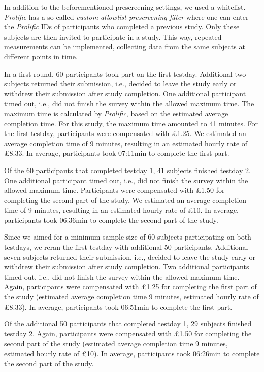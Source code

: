 \documentclass[
  man,floatsintext]{apa6}
\begin{document}
In addition to the beforementioned prescreening settings, we used a whitelist. \emph{Prolific} has a so-called \emph{custom allowlist prescreening filter} where one can enter the \emph{Prolific} IDs of participants who completed a previous study. Only these subjects are then invited to participate in a study. This way, repeated measurements can be implemented, collecting data from the same subjects at different points in time.

In a first round, 60 participants took part on the first testday. Additional two subjects returned their submission, i.e., decided to leave the study early or withdrew their submission after study completion. One additional participant timed out, i.e., did not finish the survey within the allowed maximum time. The maximum time is calculated by \emph{Prolific}, based on the estimated average completion time. For this study, the maximum time amounted to 41 minutes. For the first testday, participants were compensated with £1.25. We estimated an average completion time of 9 minutes, resulting in an estimated hourly rate of £8.33. In average, participants took 07:11min to complete the first part.

Of the 60 participants that completed testday 1, 41 subjects finished testday 2. One additional participant timed out, i.e., did not finish the survey within the allowed maximum time. Participants were compensated with £1.50 for completing the second part of the study. We estimated an average completion time of 9 minutes, resulting in an estimated hourly rate of £10. In average, participants took 06:36min to complete the second part of the study.

Since we aimed for a minimum sample size of 60 subjects participating on both testdays, we reran the first testday with additional 50 participants. Additional seven subjects returned their submission, i.e., decided to leave the study early or withdrew their submission after study completion. Two additional participants timed out, i.e., did not finish the survey within the allowed maximum time. Again, participants were compensated with £1.25 for completing the first part of the study (estimated average completion time 9 minutes, estimated hourly rate of £8.33). In average, participants took 06:51min to complete the first part.

Of the additional 50 participants that completed testday 1, 29 subjects finished testday 2. Again, participants were compensated with £1.50 for completing the second part of the study (estimated average completion time 9 minutes, estimated hourly rate of £10). In average, participants took 06:26min to complete the second part of the study.
\end{document}
